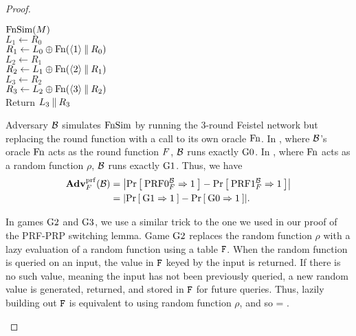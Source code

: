 \begin{proof}
\begin{center}
{\underline{$\textnormal{FnSim}(M)$}\\
$L_1 \gets R_0$\\
$R_1 \gets L_0 \oplus \textnormal{Fn}(\langle 1\rangle \: \| \: R_0)$\\
$L_2 \gets R_1$\\
$R_2 \gets L_1 \oplus \textnormal{Fn}(\langle 2\rangle \: \| \: R_1)$\\
$L_3 \gets R_2$\\
$R_3 \gets L_2 \oplus \textnormal{Fn}(\langle 3\rangle \: \| \: R_2)$\\
Return $L_3 \: \| \: R_3$
}
\end{center}

Adversary ${\mathcal B}$ simulates $\textnormal{FnSim}$ by running the 3-round Feistel network but replacing the round function with a call to its own oracle $\textnormal{Fn}$.
In , where ${\mathcal B}$'s oracle $\textnormal{Fn}$ acts as the round function $F$, ${\mathcal B}$ runs exactly ${{\textnormal G}}0$.
In , where $\textnormal{Fn}$ acts as a random function $\rho$, ${\mathcal B}$ runs exactly ${{\textnormal G}}1$.
Thus, we have
\begin{align*}
\AdvPRF{\prf}{\advB} &= \absv*{\Prob{\PRF0_\prf^\advB\Rightarrow 1} - \Prob{\PRF1_\prf^\advB\Rightarrow1}}\\
&= \absv*{\Prob{\G1\Rightarrow 1} - \Prob{\G0\Rightarrow1}}.\\
\end{align*}
\vspace{-3em}

In games ${{\textnormal G}}2$ and ${{\textnormal G}}3$, we use a similar trick to the one we used in our proof of the PRF-PRP switching lemma.
Game ${{\textnormal G}}2$ replaces the random function $\rho$ with a lazy evaluation of a random function using a table $\mathtt{F}$.
When the random function is queried on an input, the value in $\mathtt{F}$ keyed by the input is returned.
If there is no such value, meaning the input has not been previously queried, a new random value is generated, returned, and stored in $\mathtt{F}$ for future queries.
Thus, lazily building out $\mathtt{F}$ is equivalent to using random function $\rho$, and so
\bnm
{} = .
\enm

\begin{figure}[t]
\end{figure}
\end{proof}
